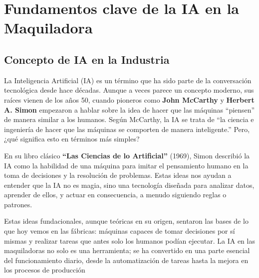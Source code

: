 
\chapter{Fundamentos clave de la IA en la
Maquiladora}\label{fundamentos-clave-de-la-ia-en-la-maquiladora}

\section{Concepto de IA en la
Industria}\label{concepto-de-ia-en-la-industria}

La Inteligencia Artificial (IA) es un término que ha sido parte de la
conversación tecnológica desde hace décadas. Aunque a veces parece un
concepto moderno, sus raíces vienen de los años 50, cuando pioneros como
\textbf{John McCarthy} y \textbf{Herbert A. Simon} empezaron a hablar
sobre la idea de hacer que las máquinas ``piensen'' de manera similar a
los humanos. Según McCarthy, la IA se trata de ``la ciencia e ingeniería
de hacer que las máquinas se comporten de manera inteligente.'' Pero,
¿qué significa esto en términos más simples?

En su libro clásico \textbf{``Las Ciencias de lo Artificial''} (1969),
Simon describió la IA como la habilidad de una máquina para imitar el
pensamiento humano en la toma de decisiones y la resolución de
problemas. Estas ideas nos ayudan a entender que la IA no es magia, sino
una tecnología diseñada para analizar datos, aprender de ellos, y actuar
en consecuencia, a menudo siguiendo reglas o patrones.

Estas ideas fundacionales, aunque teóricas en su origen, sentaron las
bases de lo que hoy vemos en las fábricas: máquinas capaces de tomar
decisiones por sí mismas y realizar tareas que antes solo los humanos
podían ejecutar. La IA en las maquiladoras no solo es una herramienta;
se ha convertido en una parte esencial del funcionamiento diario, desde
la automatización de tareas hasta la mejora en los procesos de
producción


